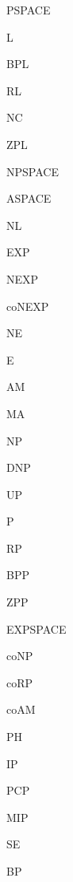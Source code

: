 \usepackage{fullpage}
\usepackage{color}
\usepackage{graphicx}
\usepackage{epsfig}
\usepackage{amsthm}
\usepackage{latexsym}
\usepackage{amssymb}
\usepackage{amsmath}

\newcommand{\newfontobj}[2]{
  \newcommand{#1}[1]{
    \expandafter\def\csname##1\endcsname{{#2 ##1}}}}

\newfontobj{\class}{\rm} %


\class{PSPACE}
\class{L}
\class{BPL}
\class{RL}
\class{NC}
\class{ZPL}
\class{NPSPACE}
\class{ASPACE}
\class{NL}
\class{EXP}
\class{NEXP}
\class{coNEXP}
\class{NE}
\class{E}
\class{AM}
\class{MA}
\class{NP}
\class{DNP}
\class{UP}
\class{P}
\class{RP}
\class{BPP}
\class{ZPP}
\class{EXPSPACE}
\class{coNP}
\class{coRP}
\class{coAM}
\class{PH}
\class{IP}
\class{PCP}
\class{MIP}
\class{SE}

\class{BP}

\newcommand{\SHARPP}{{\#\rm{P}}}
\newcommand{\PARITYP}{{\oplus\rm{P}}}

\DeclareMathOperator{\poly}{poly}
\DeclareMathOperator{\Majority}{Majority}
\DeclareMathOperator{\quasipoly}{quasi-poly}
\DeclareMathOperator{\polylog}{poly-log}
\DeclareMathOperator{\superpoly}{super-poly}
\DeclareMathOperator{\DTISP}{DTISP}
\DeclareMathOperator{\DSPACE}{DSPACE}
\DeclareMathOperator{\DTIME}{DTIME}
\DeclareMathOperator{\NSPACE}{NSPACE}
\DeclareMathOperator{\NTIME}{NTIME}
\DeclareMathOperator{\BPTIME}{BPTIME}
\DeclareMathOperator{\RTIME}{RTIME}
\DeclareMathOperator{\ZPTIME}{ZPTIME}
\DeclareMathOperator{\BPSPACE}{BPSPACE}
\DeclareMathOperator{\RSPACE}{RSPACE}
\DeclareMathOperator{\ZPSPACE}{ZPSPACE}
\DeclareMathOperator{\med}{med}


\newcommand{\CC}{\mathcal{C}}


\newcommand{\draft}[0]{
\begin{center}
	{\bf \Large {\sc DRAFT} }
\end{center}
}

\newenvironment{example}
{\smallskip \noindent \emph{Example:}}
{\hfill $\boxtimes$ \smallskip}

\newtheorem{conjecture}{Conjecture}
\newtheorem{theorem}{Theorem}
\newtheorem{proposition}{Proposition}
\newtheorem{claim}{Claim}
\newtheorem{lemma}{Lemma}
\newtheorem{corollary}{Corollary}
\newtheorem{definition}{Definition} %

\newtheorem{exercise}{Exercise}
%
     {\normalfont \small}   %
     {}    %
     {\bfseries}     %
     {}%
     {\topsep}%
     {}%
\theoremstyle{example}
